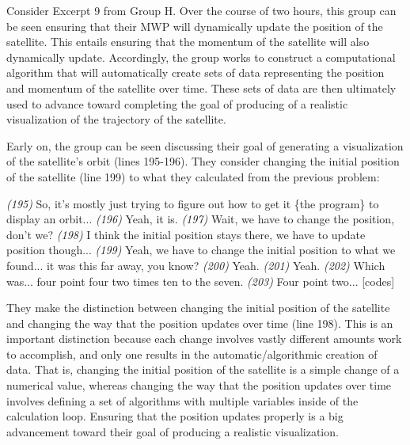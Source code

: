 \documentclass{msuphddissertation}
\begin{document}
\begin{doublespace}
Consider Excerpt 9 from Group H.  Over the course of two hours, this group can be seen ensuring that their MWP will dynamically update the position of the satellite.  This entails ensuring that the momentum of the satellite will also dynamically update.  Accordingly, the group works to construct a computational algorithm that will automatically create sets of data representing the position and momentum of the satellite over time.  These sets of data are then ultimately used to advance toward completing the goal of producing of a realistic visualization of the trajectory of the satellite.

Early on, the group can be seen discussing their goal of generating a visualization of the satellite's orbit (lines 195-196).  They consider changing the initial position of the satellite (line 199) to what they calculated from the previous problem:
\begin{description}		
\SD \textit{(195)} So, it's mostly just {trying} to figure out how to get it \{the program\} to display {an orbit}...
\SA \textit{(196)} Yeah, it is.	
\SC \textit{(197)} Wait, we have to change the position, don't we?	
\SB \textit{(198)} I think {the initial} position stays there, we have to update position though...
\SC \textit{(199)} Yeah, we have to change {the initial} position to what we found... it was this far away, you know?	
\SA \textit{(200)} Yeah.		
\SB \textit{(201)} Yeah.
\SA \textit{(202)} Which was... four point four two times ten to the seven.
\SB \textit{(203)} Four point two... [codes]
\end{description}  They make the distinction between changing the initial position of the satellite and changing the way that the position updates over time (line 198).  This is an important distinction because each change involves vastly different amounts work to accomplish, and only one results in the automatic/algorithmic creation of data.  That is, changing the initial position of the satellite is a simple change of a numerical value, whereas changing the way that the position updates over time involves defining a set of algorithms with multiple variables inside of the calculation loop.  Ensuring that the position updates properly is a big advancement toward their goal of producing a realistic visualization.


\end{doublespace}
\end{document}
